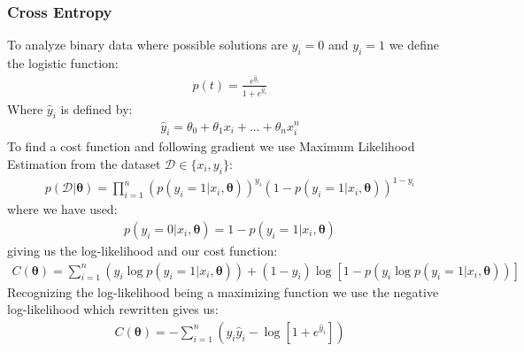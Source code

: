 \documentclass[11pt]{article}
\begin{document}
\subsubsection*{Cross Entropy}
To analyze binary data where possible solutions are $y_i=0$ and $y_i=1$ we define the logistic function:
\begin{align}
    \label{eq:logistic}
    p(t) =  \frac{e^{\hat{y}_i}}{1+e^{\hat{y}_i}}
\end{align}
Where $\hat{y}_i$ is defined by:
\begin{align*}
    \hat{y}_i = \theta_0 + \theta_1 x_i +...+ \theta_n x_i^n
\end{align*}
To find a cost function and following gradient we use Maximum Likelihood Estimation from the dataset $\mathcal{D} \in \{x_i, y_i\}$:
\begin{align*}
    p(\mathcal{D}|\boldsymbol{\theta}) = \prod_{i=1}^n (p(y_i = 1|x_i,\boldsymbol{\theta}))^{y_i}\left( 1- p(y_i = 1 | x_i, \boldsymbol{\theta})\right)^{1-y_i}
\end{align*}
where we have used:
\begin{align*}
    p(y_i=0|x_i, \boldsymbol{\theta} ) = 1 - p(y_i=1 | x_i, \boldsymbol{\theta})
\end{align*}
giving us the log-likelihood and our cost function:
\begin{align*}
    C(\boldsymbol{\theta}) = \sum_{i=1}^n (y_i \log p(y_i =1 | x_i, \boldsymbol{\theta})) + (1- y_i) \log [1 - p(y_i \log p(y_i =1 | x_i, \boldsymbol{\theta}))]
\end{align*}
Recognizing the log-likelihood being a maximizing function we use the negative log-likelihood which rewritten gives us:
\begin{align}
    \label{eq:cross}
    C(\boldsymbol{\theta}) = -\sum_{i=1}^n (y_i \hat{y}_i - \log [1 + e^{\hat{y}_i}])
\end{align}
\end{document}
